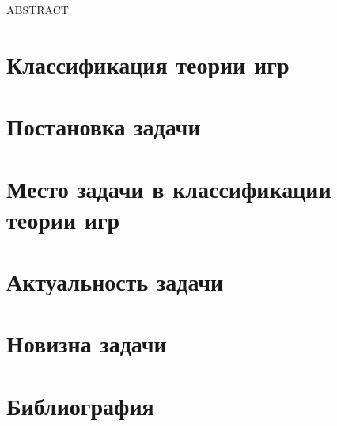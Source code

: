 \author{Егор Кузьмичев}



ABSTRACT

\section{Классификация теории игр}

\section{Постановка задачи}

\section{Место задачи в классификации теории игр}

\section{Актуальность задачи}

\section{Новизна задачи}

\section{Библиография}


